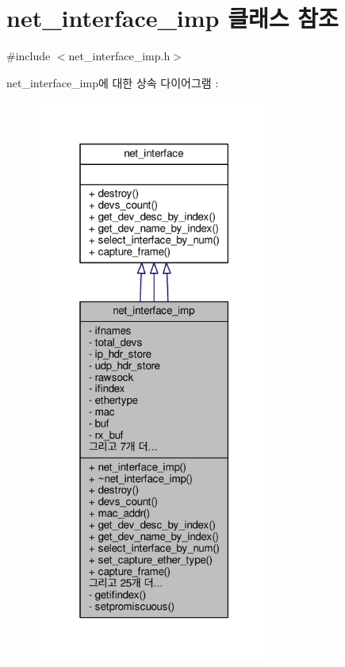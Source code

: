\hypertarget{classavdecc__lib_1_1net__interface__imp}{}\section{net\+\_\+interface\+\_\+imp 클래스 참조}
\label{classavdecc__lib_1_1net__interface__imp}


{\ttfamily \#include $<$net\+\_\+interface\+\_\+imp.\+h$>$}



net\+\_\+interface\+\_\+imp에 대한 상속 다이어그램 \+: 
\nopagebreak
\begin{figure}[H]
\begin{center}
\leavevmode
\includegraphics[width=220pt]{classavdecc__lib_1_1net__interface__imp__inherit__graph}
\end{center}
\end{figure}


